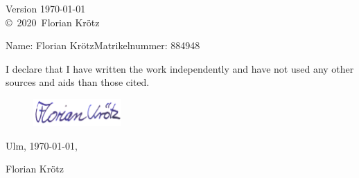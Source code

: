 \documentclass[a4paper,12pt,
headsepline,           %
oneside,               %
pointlessnumbers,      %
bibtotoc,              %
]{scrbook}
\newcommand{\fullname}{Florian Krötz}
\newcommand{\jahr}{2020}
\newcommand{\matnr}{884948}
\begin{document}
\clearpage
\thispagestyle{empty}
{ \small
  \flushleft
  Version \today \\\vfill
  \copyright~\jahr~\fullname\\[0.5em]
}

\thispagestyle{empty}

\setcounter{page}{1}
\newpage
\thispagestyle{empty}
\quad 
\newpage


\newpage
\thispagestyle{empty}
\quad 
\newpage

\setcounter{tocdepth}{2}
\tableofcontents
\listoffigures
\mainmatter







\appendix


\backmatter
\printbibliography

\clearpage
\thispagestyle{empty}

Name: \fullname \hfill Matrikelnummer: \matnr \vspace{2cm}


I declare that I have written the work independently and have not used any other sources and aids than those cited.\vspace{1.5cm}
\begin{figure}[H]
\hspace{8.75cm}
\includegraphics[width=0.3\textwidth]{images/Fueller2.1.png}
\end{figure}
\vspace{-1.3cm}
Ulm, \today, \dotfill

\hspace{10cm} {\footnotesize \fullname}
\end{document}

